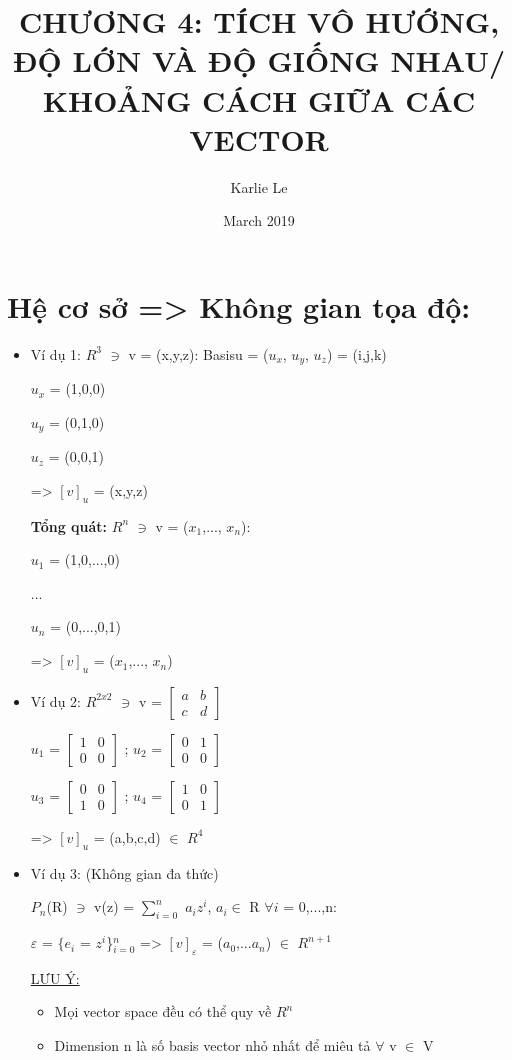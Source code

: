 \documentclass{article}
\title{CHƯƠNG 4: TÍCH VÔ HƯỚNG, ĐỘ LỚN VÀ ĐỘ GIỐNG NHAU/ KHOẢNG CÁCH GIỮA CÁC VECTOR}
\author{Karlie Le }
\date{March 2019}
\begin{document}
\maketitle

\section{Hệ cơ sở => Không gian tọa độ: }

\begin{itemize}
    \item Ví dụ 1:
$R^{3}$ $\ni$ v = (x,y,z): Basis\large{u} = ($u_{x}$, $u_{y}$, $u_{z}$) = (i,j,k)

$u_{x}$ = (1,0,0)

$u_{y}$ = (0,1,0)

$u_{z}$ = (0,0,1)

=> $[v]_{u}$ = (x,y,z) 

 \textbf{Tổng quát:}
$R^{n}$ $\ni$ v = ($x_{1}$,..., $x_{n}$):

$u_{1}$ = (1,0,...,0) 

...

$u_{n}$ = (0,...,0,1)

=> $[v]_{u}$ = ($x_{1}$,..., $x_{n}$) 

    \item Ví dụ 2: $R^{2x2}$ $\ni$ v = 
    $\begin{bmatrix}
     a & b\\ 
     c & d
    \end{bmatrix}$
    
    $u_{1}$ = 
    $\begin{bmatrix}
     1 & 0\\ 
     0 & 0
    \end{bmatrix}$
;
    $u_{2}$ = 
    $\begin{bmatrix}
     0 & 1\\ 
     0 & 0
    \end{bmatrix}$
    
    $u_{3}$ = 
    $\begin{bmatrix}
     0 & 0\\ 
     1 & 0
    \end{bmatrix}$
;    
     $u_{4}$ = 
    $\begin{bmatrix}
     1 & 0\\ 
     0 & 1
    \end{bmatrix}$

=> $[v]_{u}$ = (a,b,c,d) $\in$ $R^{4}$

    \item Ví dụ 3: (Không gian đa thức)
    
$P_{n}$(R) $\ni$ v(z) = $\sum_{i=0}^{n}$ $a_{i}$$z^{i}$, $a_i$$\in$ R $\forall i$ = 0,...,n:

$\varepsilon$ = $ \{$$e_{i}$ = $z^{i}$\}$ _{i=0}^{n}$ 
=> $[v]_{\varepsilon}$ = ($a_{0}$,...$a_{n}$) $\in$ $R^{n+1}$

\underline{LƯU Ý:}
\begin{itemize}
    \item Mọi vector space đều có thể quy về $R^{n}$
    \item Dimension n là số basis vector nhỏ nhất để miêu tả $\forall$ v $\in$ V
\end{itemize}
\end{itemize}
\end{document}
